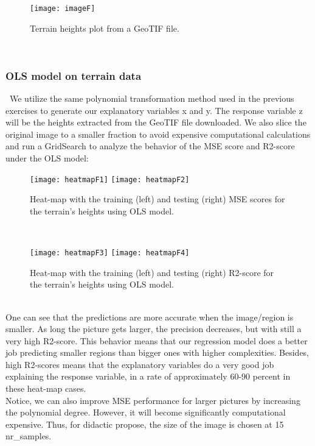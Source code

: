 \begin{figure}[H]
\label{fig:imageF}
\centering
\texttt{[image: imageF]}
\caption{Terrain heights plot from a GeoTIF file.}
\end{figure}\\

\subsubsection{OLS model on terrain data}
\label{chap:OLS model on terrain data}

\quad \, We utilize the same polynomial transformation method used in the previous exercises to generate our explanatory variables x and y. The response variable z will be the heights extracted from the GeoTIF file downloaded. We also slice the original image to a smaller fraction to avoid expensive computational calculations and run a GridSearch to analyze the behavior of the MSE score and R2-score under the OLS model: \\

\begin{figure}[H]
\label{fig:heatmapF1and2}
\centering
\texttt{[image: heatmapF1]}
\texttt{[image: heatmapF2]}
\caption{Heat-map with the training (left) and testing (right) MSE scores for the terrain's heights using OLS model.}
\end{figure}\\

\begin{figure}[H]
\label{fig:heatmapF3and4}
\centering
\texttt{[image: heatmapF3]}
\texttt{[image: heatmapF4]}
\caption{Heat-map with the training (left) and testing (right) R2-score for the terrain's heights using OLS model.}
\end{figure}\\

One can see that the predictions are more accurate when the image/region is smaller. As long the picture gets larger, the precision decreases, but with still a very high R2-score. This behavior means that our regression model does a better job predicting smaller regions than bigger ones with higher complexities. Besides, high R2-scores means that the explanatory variables do a very good job explaining the response variable, in a rate of approximately 60-90 percent in these heat-map cases. \\

Notice, we can also improve MSE performance for larger pictures by increasing the polynomial degree. However, it will become significantly computational expensive. Thus, for didactic propose, the size of the image is chosen at 15 nr\_samples. \\

